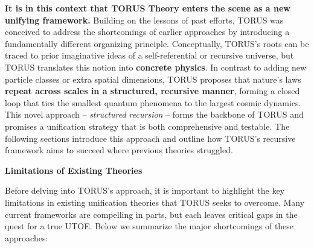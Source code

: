 \documentclass[]{article}
\begin{document}
\textbf{It is in this context that TORUS Theory enters the scene as a
new unifying framework.} Building on the lessons of past efforts, TORUS
was conceived to address the shortcomings of earlier approaches by
introducing a fundamentally different organizing principle.
Conceptually, TORUS's roots can be traced to prior imaginative ideas of
a self-referential or recursive universe, but TORUS translates this
notion into \textbf{concrete physics}. In contrast to adding new
particle classes or extra spatial dimensions, TORUS proposes that
nature's laws \textbf{repeat across scales in a structured, recursive
manner}, forming a closed loop that ties the smallest quantum phenomena
to the largest cosmic dynamics. This novel approach -- \emph{structured
recursion} -- forms the backbone of TORUS and promises a unification
strategy that is both comprehensive and testable. The following sections
introduce this approach and outline how TORUS's recursive framework aims
to succeed where previous theories struggled.

\textbf{Limitations of Existing Theories}

Before delving into TORUS's approach, it is important to highlight the
key limitations in existing unification theories that TORUS seeks to
overcome. Many current frameworks are compelling in parts, but each
leaves critical gaps in the quest for a true UTOE. Below we summarize
the major shortcomings of these approaches:
\end{document}
